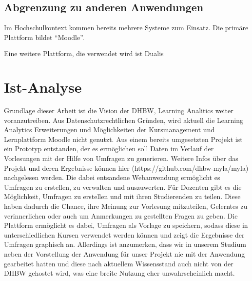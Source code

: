 \subsection{Abgrenzung zu anderen Anwendungen}
Im Hochschulkontext kommen bereits mehrere Systeme zum Einsatz.
Die primäre Plattform bildet \enquote{Moodle}.

Eine weitere Plattform, die verwendet wird ist Dualis



\section{Ist-Analyse}
Grundlage dieser Arbeit ist die Vision der DHBW, Learning Analitics weiter voranzutreiben.
Aus Datenschutzrechtlichen Gründen, wird aktuell die Learning Analytics Erweiterungen und Möglichkeiten der Kursmanagement und Lernplattform Moodle nicht genutzt.
Aus einem bereits umgesetzten Projekt ist ein Prototyp entstanden, der es ermöglichen soll Daten im Verlauf der Vorlesungen mit der Hilfe von Umfragen zu generieren.
Weitere Infos über das Projekt und deren Ergebnisse können hier (https://github.com/dhbw-myla/myla) nachgelesen werden. 
Die dabei entsandene Webanwendung ermöglicht es Umfragen zu erstellen, zu verwalten und auszuwerten.
Für Dozenten gibt es die Möglichkeit, Umfragen zu erstellen und mit ihren Studierenden zu teilen.
Diese haben dadurch die Chance, ihre Meinung zur Vorlesung mitzuteilen, Gelerntes zu verinnerlichen oder auch um Anmerkungen zu gestellten Fragen zu geben.
Die Plattform ermöglicht es dabei, Umfragen als Vorlage zu speichern, sodass diese in unterschiedlichen Kursen verwendet werden können und zeigt die Ergebnisse der Umfragen graphisch an.
Allerdings ist anzumerken, dass wir in unserem Studium neben der Vorstellung der Anwendung für unser Projekt nie mit der Anwendung gearbeitet hatten und diese nach aktuellem Wissensstand auch nicht von der DHBW gehostet wird, was eine breite Nutzung eher unwahrscheinlich macht. 



